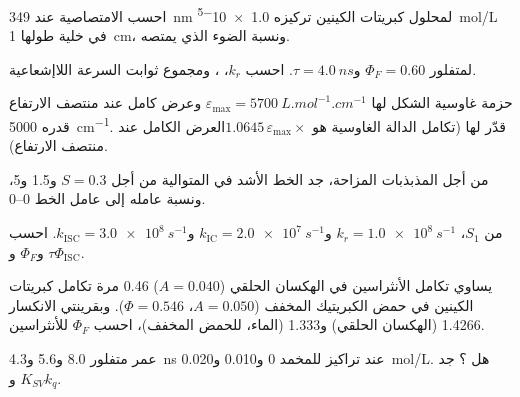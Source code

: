 \begin{exercise}[$\star$]\label{exo:b3:electronic-spectroscopy:3}
احسب الامتصاصية عند \qty{349}{nm} لمحلول كبريتات الكينين تركيزه \qty{1.0e-5}{mol/L}
في خلية طولها \qty{1}{cm}، ونسبة الضوء الذي يمتصه.
\end{exercise}

\begin{exercise}[$\star$]\label{exo:b3:electronic-spectroscopy:4}
لمتفلور $\Phi_F = 0.60$ و$\tau = \qty{4.0}{ns}$. احسب $k_r$، 
، ومجموع ثوابت السرعة اللاإشعاعية.
\end{exercise}

\begin{exercise}[$\star\star$]\label{exo:b3:electronic-spectroscopy:5}
حزمة غاوسية الشكل لها $\varepsilon_{\max} = \qty{5700}{L.mol^{-1}.cm^{-1}}$ وعرض كامل عند
منتصف الارتفاع قدره \qty{5000}{cm^{-1}}. قدّر  لها (تكامل
الدالة الغاوسية هو $1.0645\,\varepsilon_{\max}\times$العرض الكامل عند منتصف الارتفاع).
\end{exercise}

\begin{exercise}[$\star\star$]\label{exo:b3:electronic-spectroscopy:6}
من أجل المذبذبات المزاحة، جد الخط الأشد في المتوالية من أجل
$S = 0.3$ و1.5 و5، ونسبة عامله إلى عامل الخط 0--0.
\end{exercise}

\begin{exercise}[$\star\star$]\label{exo:b3:electronic-spectroscopy:7}
من $S_1$، $k_r = \qty{1.0e8}{s^{-1}}$ و$k_{\mathrm{IC}} = \qty{2.0e7}{s^{-1}}$ و$k_{\mathrm{ISC}} =
\qty{3.0e8}{s^{-1}}$. احسب $\tau$ و$\Phi_F$ و$\Phi_{\mathrm{ISC}}$.
\end{exercise}

\begin{exercise}[$\star\star$]\label{exo:b3:electronic-spectroscopy:8}
يساوي تكامل  الأنثراسين في الهكسان الحلقي ($A = 0.040$) 0.46
مرة تكامل  كبريتات الكينين في حمض الكبريتيك المخفف ($A = 0.050$، $\Phi =
0.546$). وبقرينتي الانكسار 1.4266 (الهكسان الحلقي) و1.333 (الماء، للحمض
المخفف)، احسب $\Phi_F$ للأنثراسين.
\end{exercise}

\begin{exercise}[$\star\star$]\label{exo:b3:electronic-spectroscopy:9}
عمر متفلور 8.0 و5.6 و\qty{4.3}{ns} عند تراكيز للمخمد
0 و0.010 و\qty{0.020}{mol/L}. هل ؟ جد
$K_{SV}$ و$k_q$.
\end{exercise}

